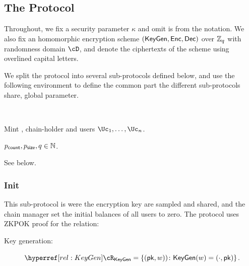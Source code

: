 \subsection{The Protocol}\label{sec:MainProtocol:Protocol}
Throughout, we fix a security parameter $\kappa$ and omit is from the notation. We also fix an homomorphic encryption scheme $(\mathsf{KeyGen},\mathsf{Enc},\mathsf{Dec})$ over ${\mathbb Z}_q$ with randomness domain $\cD$, and denote the ciphertexts of the scheme using  overlined capital letters.  %


We split  the protocol into several sub-protocols defined below, and  use the  following environment to define the common part the different sub-protocols share, \eg global parameter. 

\begin{protocol}~\label{prot:ConfidentialTransactions}


	
\item[Parties:] Mint \Mc, chain-holder \Cc and users  $\Uc_1, \ldots,\Uc_n$.

\item[Parameters:] $p_{\mathsf{count}},p_{\mathsf{size}},q \in {\mathbb{N}}$.

\item[Subprotocols:]  See below.
\end{protocol}


\subsubsection{Init}


This sub-protocol is were the encryption key are sampled and shared, and the chain manager \Cc set the initial balances  of all users to zero. The protocol  uses ZKPOK proof for the relation:
\begin{description}
	\item[Key generation:]    $\rKeyGen =\rKeyGenDef$.\label{rel:KeyGen}
\end{description}


